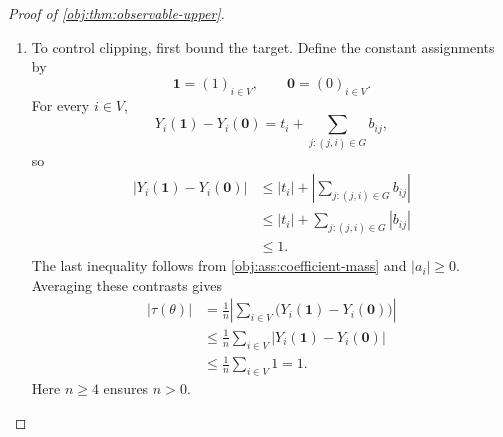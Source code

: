 \begin{proof}[Proof of \cref{obj:thm:observable-upper}]
\begin{enumerate}
For each \(i\in V\) and binary assignment \(z\in\{0,1\}^V\), the additive outcome formula and coefficient-mass bound give
\[
\begin{aligned}
|Y_i(z)|
&=
\left|a_i+t_i z_i+\sum_{j:(j,i)\in G}b_{ij}z_j\right|\\
&\le
|a_i|+|t_i z_i|
+\sum_{j:(j,i)\in G}|b_{ij}z_j|\\
&\le
|a_i|+|t_i|
+\sum_{j:(j,i)\in G}|b_{ij}|\\
&\le1,
\end{aligned}
\]
where the penultimate inequality uses \(z_j\in\{0,1\}\), and the last uses \cref{obj:ass:coefficient-mass}. Consequently,
\[
\mathbb E_Z[Y_i(Z)^2]\le\mathbb E_Z[1]=1.
\]
The in-degree bound therefore yields
\[
\begin{aligned}
\sum_{i\in V}
\bigl|\{j:(j,i)\in G\}\bigr|
\,\mathbb E_Z[Y_i(Z)^2]
&\le
\sum_{i\in V}\bigl|\{j:(j,i)\in G\}\bigr|\\
&\le\sum_{i\in V}d
=nd.
\end{aligned}
\]
Since \(n>0\), \(q>0\), and \(q\le1\),
\[
\frac{4(1-q)}{n^2q}\ge0.
\]
Combining the preceding bounds gives
\[
\begin{aligned}
\mathbb E_{P_{\theta,q}}
\left[(T_q-\tau(\theta))^2\right]
&\le
\frac{5(d+1)^2}{n}
+\frac{4(1-q)}{n^2q}\,nd\\
&=
\frac{5(d+1)^2}{n}
+\frac{4d(1-q)}{nq}
=u(n,d,q).
\end{aligned}
\]
All expectations here are integrable because the assignment--audit space is finite.

\item
To control clipping, first bound the target. Define the constant assignments by
\[
\mathbf1=(1)_{i\in V},
\qquad
\mathbf0=(0)_{i\in V}.
\]
For every \(i\in V\),
\[
Y_i(\mathbf1)-Y_i(\mathbf0)
=t_i+\sum_{j:(j,i)\in G}b_{ij},
\]
so
\[
\begin{aligned}
|Y_i(\mathbf1)-Y_i(\mathbf0)|
&\le |t_i|+
\left|\sum_{j:(j,i)\in G}b_{ij}\right|\\
&\le |t_i|+\sum_{j:(j,i)\in G}|b_{ij}|\\
&\le1.
\end{aligned}
\]
The last inequality follows from \cref{obj:ass:coefficient-mass} and \(|a_i|\ge0\). Averaging these contrasts gives
\[
\begin{aligned}
|\tau(\theta)|
&=
\frac1n
\left|\sum_{i\in V}
\bigl(Y_i(\mathbf1)-Y_i(\mathbf0)\bigr)\right|\\
&\le
\frac1n\sum_{i\in V}
|Y_i(\mathbf1)-Y_i(\mathbf0)|\\
&\le\frac1n\sum_{i\in V}1
=1.
\end{aligned}
\]
Here \(n\ge4\) ensures \(n>0\).


\end{enumerate}
\end{proof}
